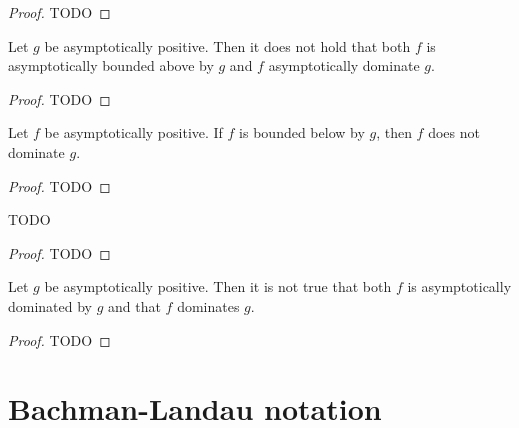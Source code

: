 \begin{proof}
    \leanok
    TODO 
\end{proof}

\begin{lemma}
    \label{lemma:not_asymp_pos_bounded_above_and_left_dom}
    \leanok
    Let $g$ be asymptotically positive. Then it does not hold that both $f$ is asymptotically 
    bounded above by $g$ and $f$ asymptotically dominate $g$.
\end{lemma}

\begin{proof}
    \leanok
    TODO 
\end{proof}

\begin{theorem}
    \label{thm:asymp_pos_bounded_above_imp_not_left_dom}
    \leanok
    Let $f$ be asymptotically positive. If $f$ is bounded below by $g$, then $f$ 
    does not dominate $g$.
\end{theorem}

\begin{proof}
    TODO 
\end{proof}

\begin{theorem}
    \label{thm:asymp_pos_left_dom_imp_not_bounded_above}
    \leanok
    TODO
\end{theorem}

\begin{proof}
    TODO 
\end{proof}

\begin{theorem}
    \label{thm:not_asymp_pos_left_and_right_dom}
    \leanok
    Let $g$ be asymptotically positive. Then it is not true that both $f$ is asymptotically
    dominated by $g$ and that $f$ dominates $g$.
\end{theorem}

\begin{proof}
    TODO 
\end{proof}


\section{Bachman-Landau notation}

